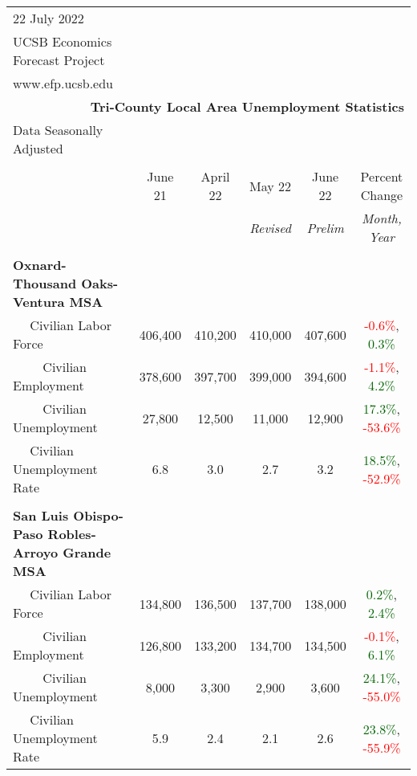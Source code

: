 \documentclass[12pt]{article}
\begin{document}
\begin{landscape}
\begin{table}
\begin{tabular}{|l|c|c|c|c|c|}
\multicolumn{1}{l}{\small 22 July 2022} & \multicolumn{5}{c}{} \\
\multicolumn{1}{l}{\small UCSB Economics Forecast Project} & \multicolumn{5}{c}{} \\
\multicolumn{1}{l}{\small www.efp.ucsb.edu} & \multicolumn{5}{c}{} \\
\multicolumn{6}{r}{\large \textbf{Tri-County Local Area Unemployment Statistics}} \\
\multicolumn{1}{l}{\small Data Seasonally Adjusted} & \multicolumn{5}{c}{} \\ \hline \hline
& & & & & \\
 & June 21 & April 22 & May 22 & June 22 & Percent Change \\
 & & & \small \textit{Revised} & \small \textit{Prelim} & \small \textit{Month, Year} \\ \hline
&&&&& \\
\textbf{Oxnard-Thousand Oaks-Ventura MSA} &&&&& \\
$\quad$ Civilian Labor Force &406,400 & 410,200 & 410,000 & 407,600 & \textcolor{red}{-0.6\%}, \textcolor{darkgreen}{0.3\%} \\
$\qquad$ \small Civilian Employment &378,600 & 397,700 & 399,000 & 394,600 & \textcolor{red}{-1.1\%}, \textcolor{darkgreen}{4.2\%} \\
$\qquad$ \small Civilian Unemployment &27,800 & 12,500 & 11,000 & 12,900 & \textcolor{darkgreen}{17.3\%}, \textcolor{red}{-53.6\%} \\
$\quad$ Civilian Unemployment Rate &6.8 & 3.0 & 2.7 & 3.2 & \textcolor{darkgreen}{18.5\%}, \textcolor{red}{-52.9\%} \\
&&&&& \\
\textbf{San Luis Obispo-Paso Robles-Arroyo Grande MSA} &&&&& \\
$\quad$ Civilian Labor Force &134,800 & 136,500 & 137,700 & 138,000 & \textcolor{darkgreen}{0.2\%}, \textcolor{darkgreen}{2.4\%} \\
$\qquad$ \small Civilian Employment &126,800 & 133,200 & 134,700 & 134,500 & \textcolor{red}{-0.1\%}, \textcolor{darkgreen}{6.1\%} \\
$\qquad$ \small Civilian Unemployment &8,000 & 3,300 & 2,900 & 3,600 & \textcolor{darkgreen}{24.1\%}, \textcolor{red}{-55.0\%} \\
$\quad$ Civilian Unemployment Rate &5.9 & 2.4 & 2.1 & 2.6 & \textcolor{darkgreen}{23.8\%}, \textcolor{red}{-55.9\%} \\

\end{tabular}
\end{table}
\end{landscape}
\end{document}
